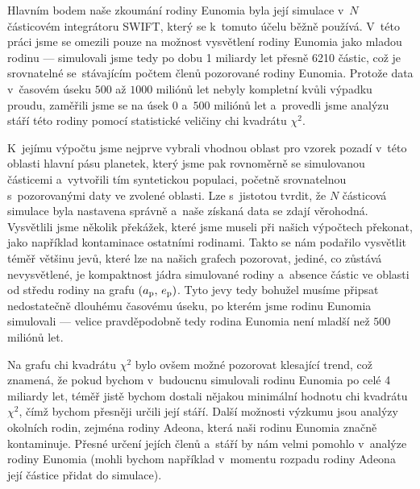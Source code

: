 \documentclass[A4paper, 12pt, oneside]{book}
\begin{document}
Hlavním bodem naše zkoumání rodiny Eunomia byla její simulace v~$N$ částicovém integrátoru SWIFT, který se k~tomuto účelu běžně používá. V~této práci jsme se omezili pouze na možnost vysvětlení rodiny Eunomia jako mladou rodinu --- simulovali jsme tedy po dobu 1 miliardy let přesně 6210 částic, což je srovnatelné se~stávajícím počtem členů pozorované rodiny Eunomia. Protože data v~časovém úseku $500$ až $1000$ miliónů let nebyly kompletní kvůli výpadku proudu, zaměřili jsme se na úsek $0$ a~$500$ miliónů let a~provedli jsme analýzu stáří této rodiny pomocí statistické veličiny chi kvadrátu $\chi^2$.

K~jejímu výpočtu jsme nejprve vybrali vhodnou oblast pro vzorek pozadí v~této oblasti hlavní pásu planetek, který jsme pak rovnoměrně  se simulovanou částicemi a~vytvořili tím syntetickou populaci, početně srovnatelnou s~pozorovanými daty ve zvolené oblasti. Lze s~jistotou tvrdit, že $N$ částicová simulace byla nastavena správně a~naše získaná data se zdají věrohodná. Vysvětlili jsme několik překážek, které jsme museli při našich výpočtech překonat, jako například kontaminace ostatními rodinami. Takto se nám podařilo vysvětlit téměř většinu jevů, které lze na našich grafech pozorovat, jediné, co zůstává nevysvětlené, je kompaktnost jádra simulované rodiny a~absence částic ve oblasti  od středu rodiny na grafu $(a_{\rm p},\,e_{\rm p})$. Tyto jevy tedy bohužel musíme připsat nedostatečně dlouhému časovému úseku, po kterém jsme rodinu Eunomia simulovali --- velice pravděpodobně tedy rodina Eunomia není mladší než $500$ miliónů let.

Na grafu chi kvadrátu $\chi^2$ bylo ovšem možné pozorovat klesající trend, což znamená, že pokud bychom v~budoucnu simulovali rodinu Eunomia po celé 4 miliardy let, téměř jistě bychom dostali nějakou minimální hodnotu chi kvadrátu $\chi^2$, čímž bychom přesněji určili její stáří. Další možnosti výzkumu jsou analýzy okolních rodin, zejména rodiny Adeona, která naši rodinu Eunomia značně kontaminuje. Přesné určení jejích členů a~stáří by nám velmi pomohlo v~analýze rodiny Eunomia (mohli bychom například v~momentu rozpadu rodiny Adeona její částice přidat do simulace).

\newpage
\end{document}
